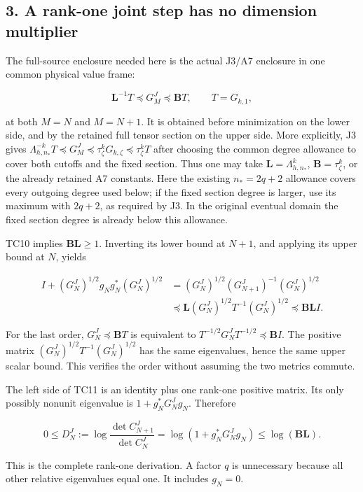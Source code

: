 \documentclass[11pt]{article}
\begin{document}
\subsection{3. A rank-one joint step has no dimension multiplier}\label{a-rank-one-joint-step-has-no-dimension-multiplier}

The full-source enclosure needed here is the actual J3/A7 enclosure in one common physical value frame:

\[
\mathbf L^{-1}T\preceq G_M^J\preceq\mathbf B T,
\qquad T=G_{k,1},
\tag{TC10}
\]

at both \(M=N\) and \(M=N+1\). It is obtained before minimization on the lower side, and by the retained full tensor section on the upper side. More explicitly, J3 gives \(\Lambda_{h,n_*}^{-k}T\preceq G_M^J\preceq\tau_\zeta^kG_{k,\zeta}\preceq\tau_\zeta^kT\) after choosing the common degree allowance to cover both cutoffs and the fixed section. Thus one may take \(\mathbf L=\Lambda_{h,n_*}^k\), \(\mathbf B=\tau_\zeta^k\), or the already retained A7 constants. Here the existing \(n_*=2q+2\) allowance covers every outgoing degree used below; if the fixed section degree is larger, use its maximum with \(2q+2\), as required by J3. In the original eventual domain the fixed section degree is already below this allowance.

TC10 implies \(\mathbf B\mathbf L\ge1\). Inverting its lower bound at \(N+1\), and applying its upper bound at \(N\), yields

\[
\begin{aligned}
I+(G_N^J)^{1/2}g_Ng_N^*(G_N^J)^{1/2}
&=(G_N^J)^{1/2}(G_{N+1}^J)^{-1}(G_N^J)^{1/2}\\
&\preceq\mathbf L(G_N^J)^{1/2}T^{-1}(G_N^J)^{1/2}
\preceq\mathbf B\mathbf L I.
\end{aligned}
\tag{TC11}
\]

For the last order, \(G_N^J\preceq\mathbf B T\) is equivalent to \(T^{-1/2}G_N^JT^{-1/2}\preceq\mathbf B I\). The positive matrix \((G_N^J)^{1/2}T^{-1}(G_N^J)^{1/2}\) has the same eigenvalues, hence the same upper scalar bound. This verifies the order without assuming the two metrics commute.

The left side of TC11 is an identity plus one rank-one positive matrix. Its only possibly nonunit eigenvalue is \(1+g_N^*G_N^Jg_N\). Therefore

\[
\boxed{0\le D_N^J
:=\log\frac{\det C_{N+1}^J}{\det C_N^J}
=\log(1+g_N^*G_N^Jg_N)
\le\log(\mathbf B\mathbf L).}
\tag{TC12}
\]

This is the complete rank-one derivation. A factor \(q\) is unnecessary because all other relative eigenvalues equal one. It includes \(g_N=0\).
\end{document}

